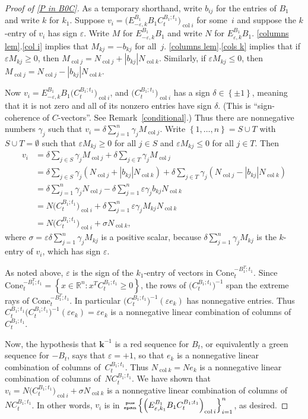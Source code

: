 \documentclass{amsart}
\theoremstyle{definition}
\theoremstyle{remark}
\numberwithin{equation}{section}
\newcommand{\reals}{\mathbb R}
\newcommand{\ep}{\varepsilon}
\newcommand{\col}{\operatorname{col}}
\newcommand{\posspan}{\!\!\tiny\begin{array}{c}\mathbf{pos}\\\mathbf{span}\end{array}\!\!}
\newcommand{\set}[1]{{\left\lbrace #1 \right\rbrace}}
\newcommand{\0}{{\mathbf{0}}}
\newcommand{\Cone}{\mathrm{Cone}}
\newcommand{\kk}{\mathbf{k}}
\begin{document}
\begin{proof}[Proof of \cref{P in B0C}]
As a temporary shorthand, write $b_{ij}$ for the entries of $B_1$ and write $k$ for $k_1$.
Suppose $v_i=\bigl(E^{B_1}_{-\ep,k}B_1C_t^{B_1;t_1}\bigr)_{\col i}$ for some~$i$ and suppose the $k$-entry of $v_i$ has sign $\ep$.
Write $M$ for $E^{B_1}_{-\ep,k}B_1$ and write $N$ for $E^{B_1}_{\ep,k}B_1$.
\cref{columns lem}.\ref{col i} implies that $M_{kj}=-b_{kj}$ for all~$j$.
\cref{columns lem}.\ref{cols k} implies that if $\ep M_{kj}\ge0$, then $M_{\col j}=N_{\col j}+|b_{kj}|N_{\col k}$.
Similarly, if $\ep M_{kj}\le0$, then $M_{\col j}=N_{\col j}-|b_{kj}|N_{\col k}$.

Now $v_i=E^{B_1}_{-\ep,k}B_1\bigl(C_t^{B_1;t_1}\bigr)_{\col i}$, and $\bigl(C_t^{B_1;t_1}\bigr)_{\col i}$ has a sign $\delta\in\set{\pm1}$, meaning that it is not zero and all of its nonzero entries have sign $\delta$.
(This is ``sign-coherence of $C$-vectors''.  
See Remark~\ref{conditional}.)
Thus there are nonnegative numbers $\gamma_j$ such that $v_i=\delta\sum_{j=1}^n\gamma_jM_{\col j}$.
Write $\set{1,\ldots,n}=S\cup T$ with $S\cup T=\emptyset$ such that $\ep M_{kj}\ge0$ for all $j\in S$ and $\ep M_{kj}\le0$ for all $j\in T$.
Then
\begin{align*}
v_i
&=\delta\sum_{j\in S}\gamma_jM_{\col j}+\delta\sum_{j\in T}\gamma_jM_{\col j}\\
&=\delta\sum_{j\in S}\gamma_j(N_{\col j}+|b_{kj}|N_{\col k})+\delta\sum_{j\in T}\gamma_j(N_{\col j}-|b_{kj}|N_{\col k})\\
&=\delta\sum_{j=1}^n\gamma_jN_{\col j}-\delta\sum_{j=1}^n\ep\gamma_jb_{kj}N_{\col k}\\
&=N\bigl(C_t^{B_1;t_1}\bigr)_{\col i}+\delta\sum_{j=1}^n\ep\gamma_jM_{kj}N_{\col k}\\
&=N\bigl(C_t^{B_1;t_1}\bigr)_{\col i}+\sigma N_{\col k},
\end{align*}
where $\sigma=\ep\delta\sum_{j=1}^n\gamma_jM_{kj}$ is a positive scalar, because $\delta\sum_{j=1}^n\gamma_jM_{kj}$ is the $k$-entry of $v_i$, which has sign $\ep$.

As noted above, $\ep$ is the sign of the $k_1$-entry of vectors in $\Cone_t^{-B_1^T;t_1}$.
Since $\Cone^{-B_1^T;t_1}_t=\set{x\in\reals^n:x^TC_t^{B_1;t_1}\ge0}$, the rows of $\bigl(C_t^{B_1;t_1}\bigr)^{-1}$ span the extreme rays of $\Cone_t^{-B_1^T;t_1}$.
In particular $\bigl(C_t^{B_1;t_1}\bigr)^{-1}(\ep e_k)$ has nonnegative entries.
Thus $C_t^{B_1;t_1}\bigl(C_t^{B_1;t_1}\bigr)^{-1}(\ep e_k)=\ep e_k$ is a nonnegative linear combination of columns of~$C_t^{B_1;t_1}$.

Now, the hypothesis that $\kk^{-1}$ is a red sequence for $B_t$, or equivalently a green sequence for $-B_t$, says that $\ep=+1$, so that $e_k$ is a nonnegative linear combination of columns of~$C_t^{B_1;t_1}$.
Thus $N_{\col k}=Ne_k$ is a nonnegative linear combination of columns of~$NC_t^{B_1;t_1}$.
We have shown that $v_i=N\bigl(C_t^{B_1;t_1}\bigr)_{\col i}+\sigma N_{\col k}$ is a nonnegative linear combination of columns of~$NC_t^{B_1;t_1}$.
In other words, $v_i$ is in $\posspan\set{\left(E^{B_1}_{\ep,k_1}B_1C_t^{B_1;t_1}\right)_{\col i}}_{i=1}^n$, as desired.
\end{proof}
\end{document}
